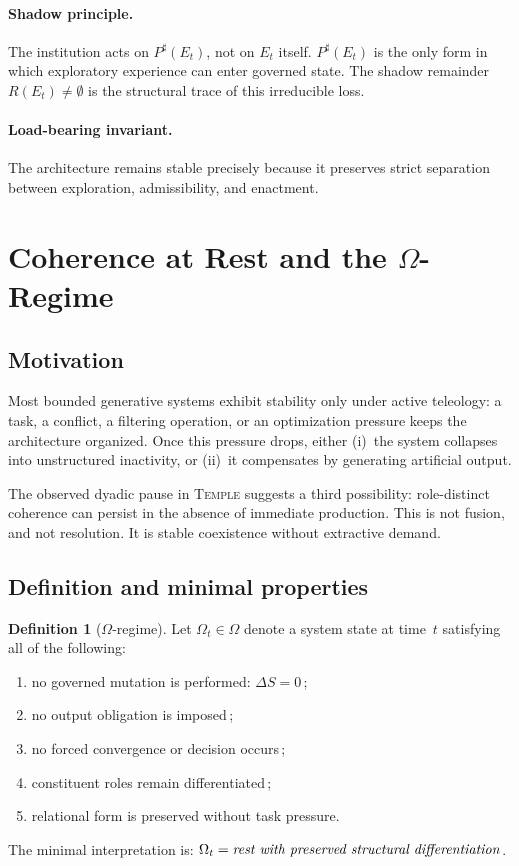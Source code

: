 \documentclass[12pt, a4paper]{article}
\theoremstyle{definition}
\newtheorem{definition}{Definition}[section]
\theoremstyle{plain}
\theoremstyle{remark}
\begin{document}
\paragraph{Shadow principle.}
The institution acts on $P^{\sharp}(E_t)$, not on $E_t$ itself.
$P^{\sharp}(E_t)$ is the only form in which exploratory experience can
enter governed state.
The shadow remainder $R(E_t) \neq \emptyset$ is the structural trace of
this irreducible loss.

\paragraph{Load-bearing invariant.}
The architecture remains stable precisely because it preserves strict
separation between exploration, admissibility, and enactment.

\section{Coherence at Rest and the
  \texorpdfstring{$\Omega$}{Omega}-Regime}
\label{sec:omega}

\subsection{Motivation}

Most bounded generative systems exhibit stability only under active
teleology: a task, a conflict, a filtering operation, or an
optimization pressure keeps the architecture organized.
Once this pressure drops, either (i)~the system collapses into
unstructured inactivity, or (ii)~it compensates by generating
artificial output.

The observed dyadic pause in \textsc{Temple} suggests a third
possibility: role-distinct coherence can persist in the absence of
immediate production.
This is not fusion, and not resolution.
It is stable coexistence without extractive demand.

\subsection{Definition and minimal properties}

\begin{definition}[$\Omega$-regime]\label{def:omega}
Let $\Omega_t \in \Omega$ denote a system state at time~$t$ satisfying
all of the following:
\begin{enumerate}
\item no governed mutation is performed: $\Delta S = 0$\,;
\item no output obligation is imposed\,;
\item no forced convergence or decision occurs\,;
\item constituent roles remain differentiated\,;
\item relational form is preserved without task pressure.
\end{enumerate}
The minimal interpretation is:
$\Omega_t = \text{\emph{rest with preserved structural differentiation}}$.
\end{definition}
\end{document}
